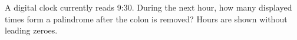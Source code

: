 A digital clock currently reads 9:30. During the next hour, how many displayed times form a palindrome after the colon is removed? Hours are shown without leading zeroes.
